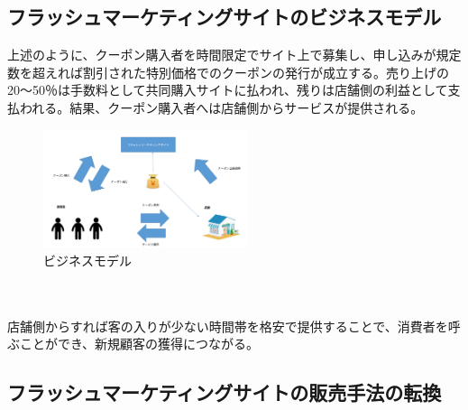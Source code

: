 \subsection{フラッシュマーケティングサイトのビジネスモデル}
上述のように、クーポン購入者を時間限定でサイト上で募集し、申し込みが規定数を超えれば割引された特別価格でのクーポンの発行が成立する。売り上げの 20〜50％は手数料として共同購入サイトに払われ、残りは店舗側の利益として支払われる。結果、クーポン購入者へは店舗側からサービスが提供される。
\\
\begin{figure}[htbp]
	\centering
	\includegraphics[width=6cm, bb=0 0 640 480]{figures/soukin.jpg}
	\caption{ビジネスモデル}
	\label{ビジネスモデル}
\end{figure}
\\
\\
店舗側からすれば客の入りが少ない時間帯を格安で提供することで、消費者を呼ぶことができ、新規顧客の獲得につながる。
\subsection{フラッシュマーケティングサイトの販売手法の転換}

